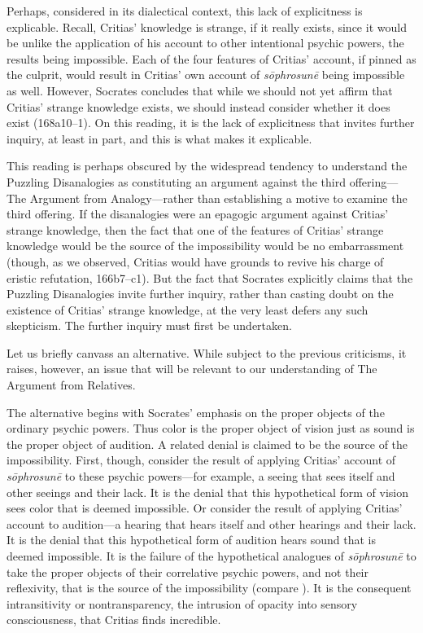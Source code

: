 Perhaps, considered in its dialectical context, this lack of explicitness is explicable. Recall, Critias' knowledge is strange, if it really exists, since it would be unlike the application of his account to other intentional psychic powers, the results being impossible. Each of the four features of Critias' account, if pinned as the culprit, would result in Critias' own account of \emph{sōphrosunē} being impossible as well. However, Socrates concludes that while we should not yet affirm that Critias' strange knowledge exists, we should instead consider whether it does exist (168a10–1). On this reading, it is the lack of explicitness that invites further inquiry, at least in part, and this is what makes it explicable.

This reading is perhaps obscured by the widespread tendency to understand the Puzzling Disanalogies as constituting an argument against the third offering—The Argument from Analogy—rather than establishing a motive to examine the third offering. If the disanalogies were an epagogic argument against Critias' strange knowledge, then the fact that one of the features of Critias' strange knowledge would be the source of the impossibility would be no embarrassment (though, as we observed, Critias would have grounds to revive his charge of eristic refutation, 166b7–c1). But the fact that Socrates explicitly claims that the Puzzling Disanalogies invite further inquiry, rather than casting doubt on the existence of Critias' strange knowledge, at the very least defers any such skepticism. The further inquiry must first be undertaken.

Let us briefly canvass an alternative. While subject to the  previous criticisms, it raises, however, an issue that will be relevant to our understanding of The Argument from Relatives.

The alternative begins with Socrates' emphasis on the proper objects of the ordinary psychic powers. Thus color is the proper object of vision just as sound is the proper object of audition. A related denial is claimed to be the source of the impossibility. First, though, consider the result of applying Critias' account of \emph{sōphrosunē} to these psychic powers—for example, a seeing that sees itself and other seeings and their lack. It is the denial that this hypothetical form of vision sees color that is deemed impossible. Or consider the result of applying Critias' account to audition—a hearing that hears itself and other hearings and their lack. It is the denial that this hypothetical form of audition hears sound that is deemed impossible. It is the failure of the hypothetical analogues of \emph{sōphrosunē} to take the proper objects of their correlative psychic powers, and not their reflexivity, that is the source of the impossibility (compare \citealt[212–4]{Tuozzo:2011aa}). It is the consequent intransitivity or nontransparency, the intrusion of opacity into sensory consciousness, that Critias finds incredible.


